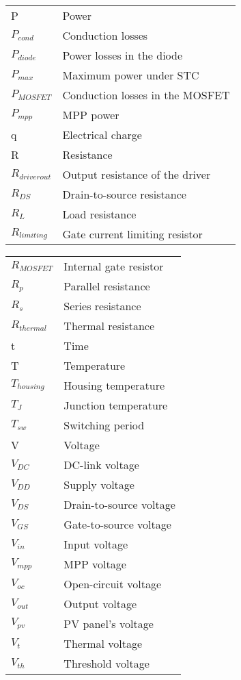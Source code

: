\begin{tabular}{ll}
P & Power\\
$P_{cond}$ & Conduction losses \\
$P_{diode}$ & Power losses in the diode \\
$P_{max}$ & Maximum power under STC\\
$P_{MOSFET}$ & Conduction losses in the MOSFET \\
$P_{mpp}$ & MPP power \\
q & Electrical charge \\
R & Resistance\\
$R_{driver out}$ & Output resistance of the driver\\
$R_{DS}$ & Drain-to-source resistance\\
$R_{L}$ & Load resistance\\
$R_{limiting}$ & Gate current limiting resistor\\ 
\end{tabular}
\newpage

\begin{tabular}{ll}
$R_{MOSFET}$ & Internal gate resistor\\
$R_{p}$ & Parallel resistance \\
$R_{s}$ & Series resistance \\
$R_{thermal}$ & Thermal resistance\\
t & Time\\
T & Temperature \\
$T_{housing}$ & Housing temperature \\
$T_{J}$ & Junction temperature \\
$T_{sw}$ & Switching period \\
V & Voltage\\
$V_{DC}$ & DC-link voltage \\
$V_{DD}$ & Supply voltage\\
$V_{DS}$ & Drain-to-source voltage\\
$V_{GS}$ & Gate-to-source voltage\\
$V_{in}$ & Input voltage \\
$V_{mpp}$ & MPP voltage\\
$V_{oc}$ & Open-circuit voltage\\
$V_{out}$ & Output voltage \\
$V_{pv}$ & PV panel's voltage \\
$V_{t}$ & Thermal voltage \\
$V_{th}$ & Threshold voltage \\
\end{tabular}
